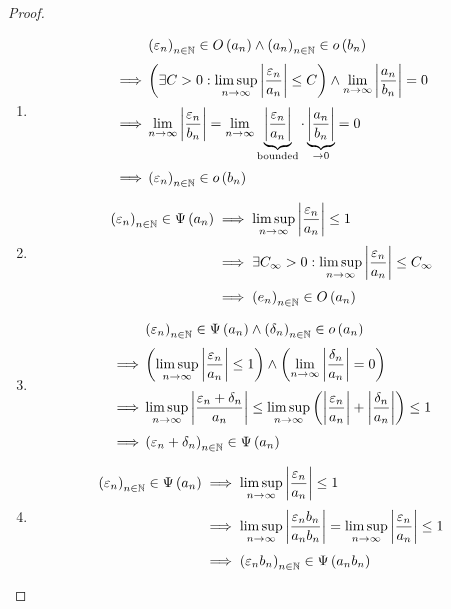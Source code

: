 \begin{proof} ~
  \begin{enumerate}
    \item \label{proof:littleo_rule}

      \begin{align}
        & \seq{\epsilon_n}\in\bigo{a_n} \land \seq{a_n} \in \littleo{b_n} \nl
        \implies & \left(\exists C > 0: \limsup_{n\to\infty} \abs{\frac{\epsilon_n}{a_n}} \le C\right) \land \lim_{n\to\infty} \abs{\frac{a_n}{b_n}} = 0 \nl
        \implies & \lim_{n\to\infty} \abs{\frac{\epsilon_n}{b_n}} = \lim_{n\to\infty} \underbrace{\abs{\frac{\epsilon_n}{a_n}}}_{\text{bounded}} \cdot \underbrace{\abs{\frac{a_n}{b_n}}}_{\to 0} = 0 \nl
        \implies & \seq{\epsilon_n} \in \littleo{b_n}
      \end{align}
    \item

      \begin{align}
        \seq{\epsilon_n} \in \bigpsi{a_n} & \implies \limsup_{n\to\infty} \abs{\frac{\epsilon_n}{a_n}} \le 1 \nl
                                          & \implies \exists C_\infty > 0 : \limsup_{n\to\infty} \abs{\frac{\epsilon_n}{a_n}} \le C_\infty \nl
                                          & \implies \seq{e_n} \in \bigo{a_n}
      \end{align}

    \item

      \begin{align}
        & \seq{\epsilon_n} \in \bigpsi{a_n} \land \seq{\delta_n} \in \littleo{a_n} \nl
        \implies& \left(\limsup_{n\to\infty} \abs{\frac{\epsilon_n}{a_n}} \le 1\right) \land \left(\lim_{n\to\infty} \abs{\frac{\delta_n}{a_n}} = 0\right) \nl
        \implies& \limsup_{n\to\infty} \abs{\frac{\epsilon_n+\delta_n}{a_n}} \le \limsup_{n\to\infty} \left(\abs{\frac{\epsilon_n}{a_n}}+\abs{\frac{\delta_n}{a_n}}\right) \le 1 \nl
        \implies& \seq{\epsilon_n+\delta_n} \in \bigpsi{a_n}
      \end{align}

    \item

      \begin{align}
        \seq{\epsilon_n} \in \bigpsi{a_n}  & \implies \limsup_{n\to\infty} \abs{\frac{\epsilon_n}{a_n}} \le 1 \nl
        & \implies \limsup_{n\to\infty} \abs{\frac{\epsilon_n b_n}{a_n b_n}} = \limsup_{n\to\infty} \abs{\frac{\epsilon_n}{a_n}} \le 1 \nl
        & \implies \seq{\epsilon_n b_n} \in \bigpsi{a_n b_n}
      \end{align}


\end{enumerate}
\end{proof}
